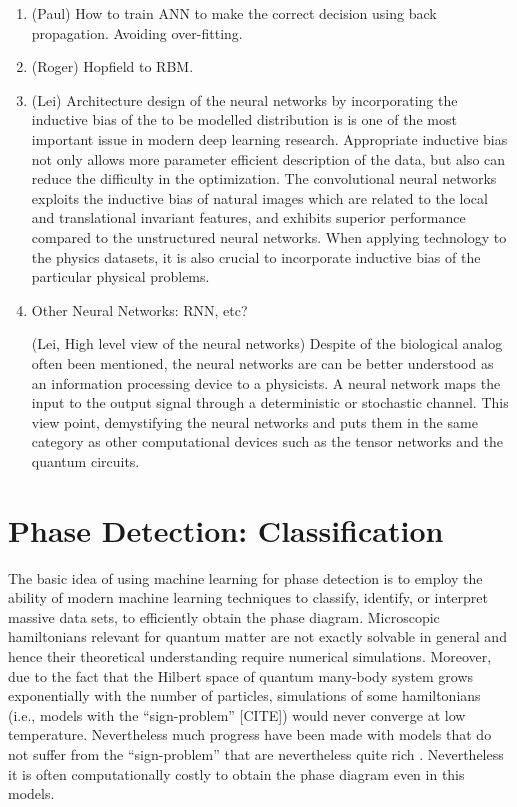 \documentclass[aps,prb,floatfix,amsmath,amssymb,amsfonts,10pt,floatfix,longbibliography]{revtex4-1}
\begin{document}
\begin{enumerate}
\item (Paul) How to train ANN to make the correct decision using back propagation. Avoiding over-fitting.

\item (Roger)  Hopfield to RBM. 

	
\item (Lei) Architecture design of the neural networks by incorporating the inductive bias of the to be modelled distribution is is one of the most important issue in modern deep learning research. Appropriate inductive bias not only allows more parameter efficient description of the data, but also can reduce the difficulty in the optimization. The convolutional neural networks exploits the inductive bias of natural images which are related to the local and translational invariant features, and exhibits superior performance compared to the unstructured neural networks. When applying technology to the physics datasets, it is also crucial to incorporate inductive bias of the particular physical problems. 
	
\item Other Neural Networks: RNN, etc?

(Lei, High level view of the neural networks) Despite of the biological analog often been mentioned, the neural networks are can be better understood as an information processing device to a physicists. A neural network maps the input to the output signal through a deterministic or stochastic channel. This view point, demystifying the neural networks and puts them in the same category as other computational devices such as the tensor networks and the quantum circuits. %
  
\end{enumerate}  

\section{Phase Detection: Classification}
\label{sec:phase}
The basic idea of using machine learning for phase detection is to employ the ability of modern machine
learning techniques to classify, identify, or interpret massive data sets, to efficiently obtain the phase diagram\cite{Carrasquilla2017a}. 
Microscopic hamiltonians relevant for quantum matter  are not exactly solvable in general and hence their theoretical understanding require numerical simulations. Moreover, due to  the fact that the Hilbert space of quantum many-body system grows exponentially with the number of particles, simulations of some hamiltonians (i.e., models with the ``sign-problem'' [CITE]) would never converge at low temperature. Nevertheless much progress have been made with models that do not suffer from the ``sign-problem''  that are nevertheless quite rich \cite{Berg2012,Schattner2016a,Gerlach2017,Xu2017a,Lederer2017,Li2016,Li2017,Jiang2017}. Nevertheless it is often computationally costly to obtain the phase diagram even in this models. 
\end{document}

